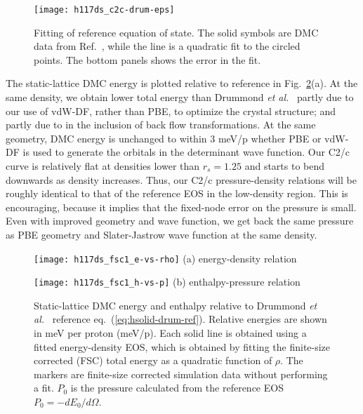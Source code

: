\begin{figure}[h]
\centering
\texttt{[image: h117ds\_c2c-drum-eps]}
\caption{Fitting of reference equation of state. The solid symbols are DMC data from Ref.~\cite{Drummond2015}, while the line is a quadratic fit to the circled points. The bottom panels shows the error in the fit.}
\label{fig:hsolid-drum-eos}
\end{figure}

The static-lattice DMC energy is plotted relative to reference in Fig.~\ref{fig:static-qmc-vs-drummond}(a). At the same density, we obtain lower total energy than Drummond \textit{et al.}~\cite{Drummond2015} partly due to our use of vdW-DF, rather than  PBE, to optimize the crystal structure; and partly due to in the inclusion of back flow transformations. At the same geometry, DMC energy is unchanged to within 3 meV/p whether PBE or vdW-DF is used to generate the orbitals in the determinant wave function.
Our C2/c curve is relatively flat at densities lower than $r_s=1.25$ and starts to bend downwards as density increases.
Thus, our C2/c pressure-density relations will be roughly identical to that of the reference EOS in the low-density region.
This is encouraging, because it implies that the fixed-node error on the pressure is small.
Even with improved geometry and wave function, we get back the same pressure as PBE geometry and Slater-Jastrow wave function at the same density.

\begin{figure}[h]
\begin{minipage}{0.49\textwidth}
\centering
\texttt{[image: h117ds\_fsc1\_e-vs-rho]}
(a) energy-density relation
\end{minipage}
\begin{minipage}{0.49\textwidth}
\centering
\texttt{[image: h117ds\_fsc1\_h-vs-p]}
(b) enthalpy-pressure relation
\end{minipage}
\caption{Static-lattice DMC energy and enthalpy relative to Drummond \textit{et al.}~\cite{Drummond2015} reference eq.~(\ref{eq:hsolid-drum-ref}). Relative energies are shown in meV per proton (meV/p). Each solid line is obtained using a fitted energy-density EOS, which is obtained by fitting the finite-size corrected (FSC) total energy as a quadratic function of $\rho$. The markers are finite-size corrected simulation data without performing a fit. $P_0$ is the pressure calculated from the reference EOS $P_0=-dE_0/d\Omega$. \label{fig:static-qmc-vs-drummond}}
\end{figure}

